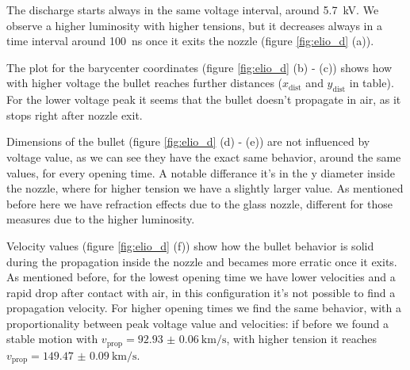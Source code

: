 The discharge starts always in the same voltage interval, around \SI{5.7}{\kilo\volt}. We observe a higher luminosity with higher tensions, but it decreases always in a time interval around \SI{100}{\nano\second} once it exits the nozzle (figure \ref{fig:elio_d} (a)).

The plot for the barycenter coordinates (figure \ref{fig:elio_d} (b) - (c)) shows how with higher voltage the bullet reaches further distances ($x_{\text{dist}}$ and $y_{\text{dist}}$ in table). For the lower voltage peak it seems that the bullet doesn't propagate in air, as it stops right after nozzle exit.

Dimensions of the bullet (figure \ref{fig:elio_d} (d) - (e)) are not influenced by voltage value, as we can see they have the exact same behavior, around the same values, for every opening time. A notable differance it's in the y diameter inside the nozzle, where for higher tension we have a slightly larger value. As mentioned before here we have refraction effects due to the glass nozzle, different for those measures due to the higher luminosity.

Velocity values (figure \ref{fig:elio_d} (f)) show how the bullet behavior is solid during the propagation inside the nozzle and becames more erratic once it exits. As mentioned before, for the lowest opening time we have lower velocities and a rapid drop after contact with air, in this configuration it's not possible to find a propagation velocity. For higher opening times we find the same behavior, with a proportionality between peak voltage value and velocities: if before we found a stable motion with $v_{\text{prop}} = \SI{92.93(6)}{\kilo\meter/\second}$, with higher tension it reaches $v_{\text{prop}} = \SI{149.47(9)}{\kilo\meter/\second}$.

